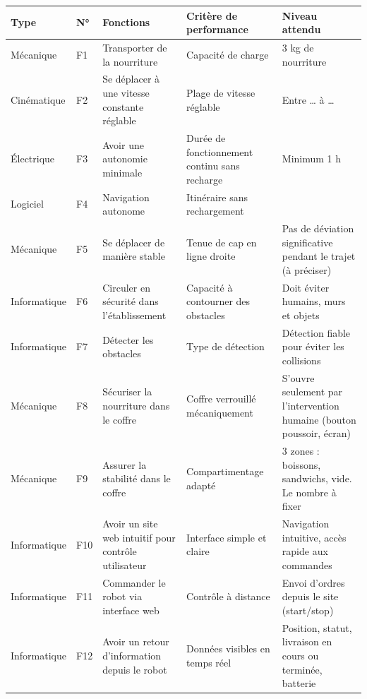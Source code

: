 \documentclass[a4paper,12pt]{report}  %
\begin{document}
{\fontsize{10pt}{12pt}\selectfont 
\begin{longtable}{|l|l|p{4cm}|p{4cm}|p{4cm}|}
	\hline
	\textbf{Type} & \textbf{N°} & \textbf{Fonctions} 
	& \textbf{Critère de performance} & \textbf{Niveau attendu} \\
	\hline
	\endhead
	
	\hline
	\endfoot
	
	\hline
	Mécanique & F1 & Transporter de la nourriture & Capacité de charge & 3 kg de nourriture  \\
	
	\hline
	Cinématique & F2 & Se déplacer à une vitesse constante réglable & Plage de vitesse réglable & Entre \ldots{} à \ldots{}  \\
	
	\hline
	Électrique & F3 & Avoir une autonomie minimale & Durée de fonctionnement continu sans recharge & Minimum 1 h  \\
	
	\hline
	Logiciel & F4 & Navigation autonome & Itinéraire sans rechargement & \\
	
	\hline
	Mécanique & F5 & Se déplacer de manière stable & Tenue de cap en ligne droite & Pas de déviation significative pendant le trajet (à préciser) \\
	
	\hline
	Informatique & F6 & Circuler en sécurité dans l'établissement & Capacité à contourner des obstacles & Doit éviter humains, murs et objets  \\
	
	\hline
	Informatique & F7 & Détecter les obstacles & Type de détection & Détection fiable pour éviter les collisions \\
	
	\hline
	Mécanique & F8 & Sécuriser la nourriture dans le coffre & Coffre verrouillé mécaniquement & S'ouvre seulement par l'intervention humaine (bouton poussoir, écran)  \\
	
	\hline
	Mécanique & F9 & Assurer la stabilité dans le coffre & Compartimentage adapté & 3 zones : boissons, sandwichs, vide. Le nombre à fixer \\
	
	\hline
	Informatique & F10 & Avoir un site web intuitif pour contrôle utilisateur & Interface simple et claire & Navigation intuitive, accès rapide aux commandes \\
	
	\hline
	Informatique & F11 & Commander le robot via interface web & Contrôle à distance & Envoi d'ordres depuis le site (start/stop) \\
	
	\hline
	Informatique & F12 & Avoir un retour d'information depuis le robot & Données visibles en temps réel & Position, statut, livraison en cours ou terminée, batterie \\
	
\end{longtable}
}
\end{document}
